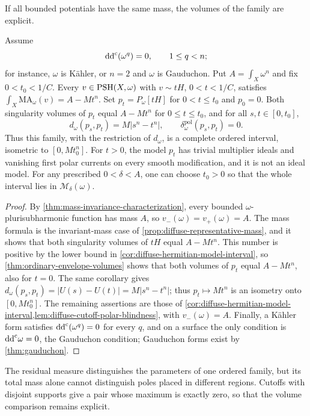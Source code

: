 If all bounded potentials have the same mass, the volumes of the family are explicit.

\begin{corollary}\label{cor:diffuse-mass-invariant-models}\label{cor:diffuse-product-exact-volume}
Assume
\[
 \mathrm{dd}^{\mathrm{c}}(\omega^q)=0,\qquad 1\leq q<n;
\]
for instance, $\omega$ is K\"ahler, or $n=2$ and $\omega$ is Gauduchon. Put $A=\int_X\omega^n$ and fix $0<t_0<1/C$. Every $v\in\mathrm{PSH}(X,\omega)$ with $v\sim tH$, $0<t<1/C$, satisfies $\int_X\mathrm{MA}_\omega(v)=A-Mt^n$. Set $p_t=P_\omega[tH]$ for $0<t\leq t_0$ and $p_0=0$. Both singularity volumes of $p_t$ equal $A-Mt^n$ for $0\leq t\leq t_0$, and for all $s,t\in[0,t_0]$,
\[
 d_\omega(p_s,p_t)=M|s^n-t^n|,
 \qquad \delta_\omega^{\mathrm{pol}}(p_s,p_t)=0.
\]
Thus this family, with the restriction of $d_\omega$, is a complete ordered interval, isometric to $[0,Mt_0^n]$. For $t>0$, the model $p_t$ has trivial multiplier ideals and vanishing first polar currents on every smooth modification, and it is not an ideal model. For any prescribed $0<\delta<A$, one can choose $t_0>0$ so that the whole interval lies in $\mathcal M_\delta(\omega)$.
\end{corollary}
\begin{proof}
By \cref{thm:mass-invariance-characterization}, every bounded $\omega$-plurisubharmonic function has mass $A$, so $v_-(\omega)=v_+(\omega)=A$. The mass formula is the invariant-mass case of \cref{prop:diffuse-representative-mass}, and it shows that both singularity volumes of $tH$ equal $A-Mt^n$. This number is positive by the lower bound in \cref{cor:diffuse-hermitian-model-interval}, so \cref{thm:ordinary-envelope-volumes} shows that both volumes of $p_t$ equal $A-Mt^n$, also for $t=0$. The same corollary gives $d_\omega(p_s,p_t)=|U(s)-U(t)|=M|s^n-t^n|$; thus $p_t\mapsto Mt^n$ is an isometry onto $[0,Mt_0^n]$. The remaining assertions are those of \cref{cor:diffuse-hermitian-model-interval,lem:diffuse-cutoff-polar-blindness}, with $v_-(\omega)=A$. Finally, a K\"ahler form satisfies $\mathrm{dd}^{\mathrm{c}}(\omega^q)=0$ for every $q$, and on a surface the only condition is $\mathrm{dd}^{\mathrm{c}}\omega=0$, the Gauduchon condition; Gauduchon forms exist by \cref{thm:gauduchon}.
\end{proof}

The residual measure distinguishes the parameters of one ordered family, but its total mass alone cannot distinguish poles placed in different regions. Cutoffs with disjoint supports give a pair whose maximum is exactly zero, so that the volume comparison remains explicit.

